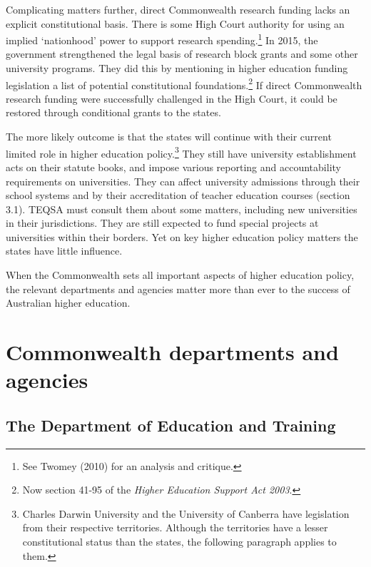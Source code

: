 \documentclass[]{book}
\begin{document}
Complicating matters further, direct Commonwealth research funding lacks an explicit constitutional basis. There is some High Court authority for using an implied `nationhood' power to support research spending.\footnote{See Twomey (2010) for an analysis and critique.} In 2015, the government strengthened the legal basis of research block grants and some other university programs. They did this by mentioning in higher education funding legislation a list of potential constitutional foundations.\footnote{Now section 41-95 of the \emph{Higher Education Support Act 2003}.} If direct Commonwealth research funding were successfully challenged in the High Court, it could be restored through conditional grants to the states.

The more likely outcome is that the states will continue with their current limited role in higher education policy.\footnote{Charles Darwin University and the University of Canberra have legislation from their respective territories. Although the territories have a lesser constitutional status than the states, the following paragraph applies to them.} They still have university establishment acts on their statute books, and impose various reporting and accountability requirements on universities. They can affect university admissions through their school systems and by their accreditation of teacher education courses (section 3.1). TEQSA must consult them about some matters, including new universities in their jurisdictions. They are still expected to fund special projects at universities within their borders. Yet on key higher education policy matters the states have little influence.

When the Commonwealth sets all important aspects of higher education policy, the relevant departments and agencies matter more than ever to the success of Australian higher education.

\hypertarget{commonwealth-departments-and-agencies}{%
\section{Commonwealth departments and agencies}\label{commonwealth-departments-and-agencies}}

\hypertarget{the-department-of-education-and-training}{%
\subsection{The Department of Education and Training}\label{the-department-of-education-and-training}}
\end{document}
